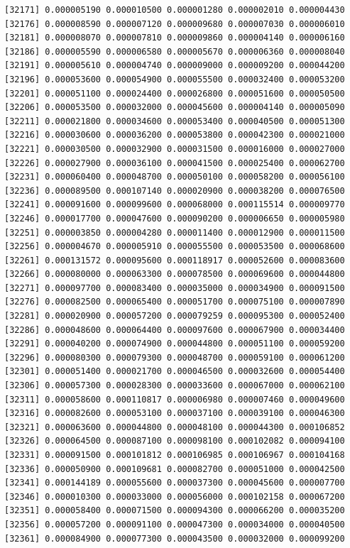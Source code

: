 \documentclass[]{article}
\begin{document}
\begin{verbatim}
[32171] 0.000005190 0.000010500 0.000001280 0.000002010 0.000004430
[32176] 0.000008590 0.000007120 0.000009680 0.000007030 0.000006010
[32181] 0.000008070 0.000007810 0.000009860 0.000004140 0.000006160
[32186] 0.000005590 0.000006580 0.000005670 0.000006360 0.000008040
[32191] 0.000005610 0.000004740 0.000009000 0.000009200 0.000044200
[32196] 0.000053600 0.000054900 0.000055500 0.000032400 0.000053200
[32201] 0.000051100 0.000024400 0.000026800 0.000051600 0.000050500
[32206] 0.000053500 0.000032000 0.000045600 0.000004140 0.000005090
[32211] 0.000021800 0.000034600 0.000053400 0.000040500 0.000051300
[32216] 0.000030600 0.000036200 0.000053800 0.000042300 0.000021000
[32221] 0.000030500 0.000032900 0.000031500 0.000016000 0.000027000
[32226] 0.000027900 0.000036100 0.000041500 0.000025400 0.000062700
[32231] 0.000060400 0.000048700 0.000050100 0.000058200 0.000056100
[32236] 0.000089500 0.000107140 0.000020900 0.000038200 0.000076500
[32241] 0.000091600 0.000099600 0.000068000 0.000115514 0.000009770
[32246] 0.000017700 0.000047600 0.000090200 0.000006650 0.000005980
[32251] 0.000003850 0.000004280 0.000011400 0.000012900 0.000011500
[32256] 0.000004670 0.000005910 0.000055500 0.000053500 0.000068600
[32261] 0.000131572 0.000095600 0.000118917 0.000052600 0.000083600
[32266] 0.000080000 0.000063300 0.000078500 0.000069600 0.000044800
[32271] 0.000097700 0.000083400 0.000035000 0.000034900 0.000091500
[32276] 0.000082500 0.000065400 0.000051700 0.000075100 0.000007890
[32281] 0.000020900 0.000057200 0.000079259 0.000095300 0.000052400
[32286] 0.000048600 0.000064400 0.000097600 0.000067900 0.000034400
[32291] 0.000040200 0.000074900 0.000044800 0.000051100 0.000059200
[32296] 0.000080300 0.000079300 0.000048700 0.000059100 0.000061200
[32301] 0.000051400 0.000021700 0.000046500 0.000032600 0.000054400
[32306] 0.000057300 0.000028300 0.000033600 0.000067000 0.000062100
[32311] 0.000058600 0.000110817 0.000006980 0.000007460 0.000049600
[32316] 0.000082600 0.000053100 0.000037100 0.000039100 0.000046300
[32321] 0.000063600 0.000044800 0.000048100 0.000044300 0.000106852
[32326] 0.000064500 0.000087100 0.000098100 0.000102082 0.000094100
[32331] 0.000091500 0.000101812 0.000106985 0.000106967 0.000104168
[32336] 0.000050900 0.000109681 0.000082700 0.000051000 0.000042500
[32341] 0.000144189 0.000055600 0.000037300 0.000045600 0.000007700
[32346] 0.000010300 0.000033000 0.000056000 0.000102158 0.000067200
[32351] 0.000058400 0.000071500 0.000094300 0.000066200 0.000035200
[32356] 0.000057200 0.000091100 0.000047300 0.000034000 0.000040500
[32361] 0.000084900 0.000077300 0.000043500 0.000032000 0.000099200

\end{verbatim}
\end{document}
